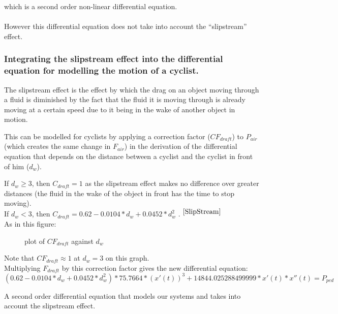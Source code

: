 \documentclass[10pt, a4paper]{report}
\begin{document}
which is a second order non-linear differential equation.\\\\

However this differential equation does not take into account the ``slipstream'' effect.

\subsubsection{Integrating the slipstream effect into the differential equation for modelling the motion of a cyclist.}

The slipstream effect is the effect by which the drag on an object moving through a fluid is diminished by the fact that the fluid it is moving through is already moving at a certain speed due to it being in the wake of another object in motion. \newline \par

This can be modelled for cyclists by applying a correction factor ($CF_{draft}$) to $P_{air}$ (which creates the same change in $F_{air}$) in the derivation of the differential equation that depends on the distance between a cyclist and the cyclist in front of him ($d_w$). \newline \par

If $d_w \ge 3$, then $C_{draft} = 1$ as the slipstream effect makes no difference over greater distances (the fluid in the wake of the object in front has the time to stop moving). \\
If $d_w < 3$, then $C_{draft} = 0.62 - 0.0104*d_w + 0.0452*d_w^2$ . $^{\cite{SlipStream}}$ \\
As in this figure:

\begin{figure}[!ht]
  \centering
    
  \caption{plot of $CF_{draft}$ against $d_w$}
\end{figure}

Note that $CF_{draft} \approx 1$ at $d_w = 3$ on this graph. \\

Multiplying $F_{draft}$ by this correction factor gives the new differential equation:
$$ (0.62 - 0.0104*d_w + 0.0452*d_w^2) * 75.7664 *(x'(t))^{3} + 14844.025288499999 * x'(t) * x''(t) = P_{ped}$$

A second order differential equation that models our systems and takes into account the slipstream effect.
\end{document}
